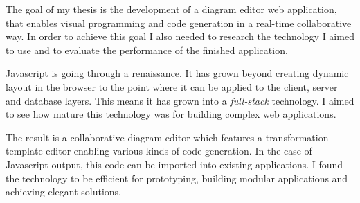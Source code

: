 The goal of my thesis is the development of a diagram editor web application, that enables visual programming and code generation in a real-time collaborative way. In order to achieve this goal I also needed to research the technology I aimed to use and to evaluate the performance of the finished application. 

Javascript is going through a renaissance. It has grown beyond creating dynamic layout in the browser to the point where it can be applied to the client, server and database layers. This means it has grown into a \emph{full-stack} technology. I aimed to see how mature this technology was for building complex web applications.

The result is a collaborative diagram editor which features a transformation template editor enabling various kinds of code generation. In the case of Javascript output, this code can be imported into existing applications. I found the technology to be efficient for prototyping, building modular applications and achieving elegant solutions. 

\vfill

